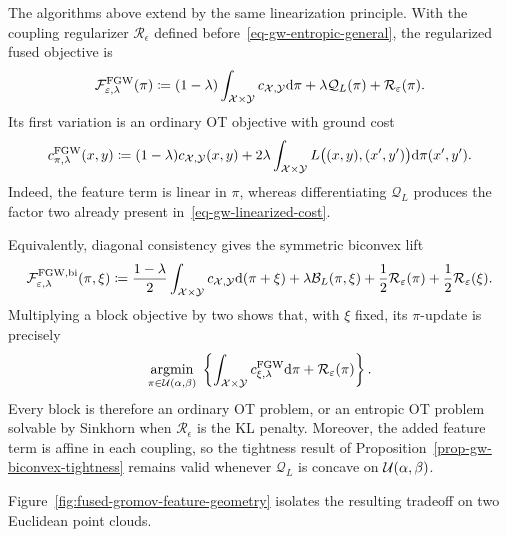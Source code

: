 The algorithms above extend by the same linearization principle. With the coupling regularizer $\mathcal R_\epsilon$ defined before~\eqref{eq-gw-entropic-general}, the regularized fused objective is
\[
	\mathcal F_{\varepsilon,\lambda}^{\mathrm{FGW}}(\pi)
	\coloneqq
	(1-\lambda)\int_{\mathcal{X}\times\mathcal{Y}}c_{\mathcal{X},\mathcal{Y}}\mathrm{d}\pi
	+
	\lambda\mathcal Q_L(\pi)
	+
	\mathcal R_\varepsilon(\pi).
\]
Its first variation is an ordinary OT objective with ground cost
\begin{equation}\label{eq-fused-gw-linearized-cost}
	c_{\pi,\lambda}^{\mathrm{FGW}}(x,y)
	\coloneqq
	(1-\lambda)c_{\mathcal{X},\mathcal{Y}}(x,y)
	+
	2\lambda
	\int_{\mathcal{X}\times\mathcal{Y}}
	L\bigl((x,y),(x',y')\bigr)\mathrm{d}\pi(x',y').
\end{equation}
Indeed, the feature term is linear in $\pi$, whereas differentiating $\mathcal Q_L$ produces the factor two already present in~\eqref{eq-gw-linearized-cost}.

Equivalently, diagonal consistency gives the symmetric biconvex lift
\[
	\mathcal F_{\varepsilon,\lambda}^{\mathrm{FGW,bi}}(\pi,\xi)
	\coloneqq
	\frac{1-\lambda}{2}
	\int_{\mathcal{X}\times\mathcal{Y}}c_{\mathcal{X},\mathcal{Y}}\mathrm{d}(\pi+\xi)
	+
	\lambda\mathcal B_L(\pi,\xi)
	+
	\frac12\mathcal R_\varepsilon(\pi)
	+
	\frac12\mathcal R_\varepsilon(\xi).
\]
Multiplying a block objective by two shows that, with $\xi$ fixed, its $\pi$-update is precisely
\[
	\underset{\pi\in\mathcal{U}(\alpha,\beta)}{\operatorname{argmin}}\;
	\left\{
		\int_{\mathcal{X}\times\mathcal{Y}}c_{\xi,\lambda}^{\mathrm{FGW}}\mathrm{d}\pi
		+
		\mathcal R_\varepsilon(\pi)
	\right\}.
\]
Every block is therefore an ordinary OT problem, or an entropic OT problem solvable by Sinkhorn when $\mathcal R_\epsilon$ is the KL penalty. Moreover, the added feature term is affine in each coupling, so the tightness result of Proposition~\ref{prop-gw-biconvex-tightness} remains valid whenever $\mathcal Q_L$ is concave on $\mathcal{U}(\alpha,\beta)$.

Figure~\ref{fig:fused-gromov-feature-geometry} isolates the resulting tradeoff on two Euclidean point clouds.

